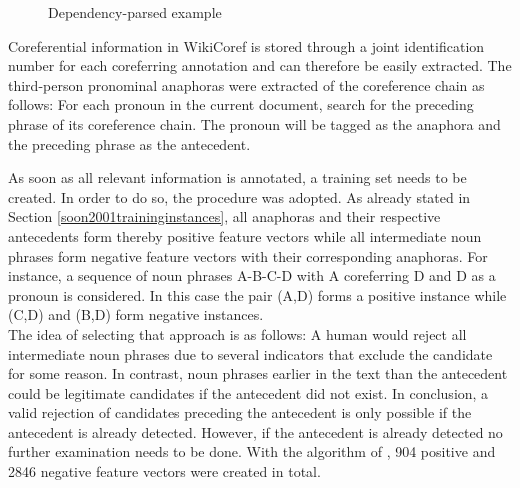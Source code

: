 \begin{figure}[h]
	\centering
	\caption{Dependency-parsed example}
	\label{figure:dependencytree}
\end{figure}


Coreferential information in WikiCoref is stored through a joint identification number for each coreferring annotation and can therefore be easily extracted. The third-person pronominal anaphoras were extracted of the coreference chain as follows: For each pronoun in the current document, search for the preceding phrase of its coreference chain. The pronoun will be tagged as the anaphora and the preceding phrase as the antecedent. 

As soon as all relevant information is annotated, a training set needs to be created. In order to do so, the procedure \cite{soon2001machine} was adopted. As already stated in Section \ref{soon2001traininginstances}, all anaphoras and their respective antecedents form thereby positive feature vectors while all intermediate noun phrases form negative feature vectors with their corresponding anaphoras. For instance, a sequence of noun phrases A-B-C-D with A coreferring D and D as a pronoun is considered. In this case the pair (A,D) forms a positive instance while (C,D) and (B,D) form negative instances.\\
The idea of selecting that approach is as follows: A human would reject all intermediate noun phrases due to several indicators that exclude the candidate for some reason. In contrast, noun phrases earlier in the text than the antecedent could be legitimate candidates if the antecedent did not exist. In conclusion, a valid rejection of candidates preceding the antecedent is only possible if the antecedent is already detected. However, if the antecedent is already detected no further examination needs to be done. With the algorithm of \cite{soon2001machine}, 904 positive and 2846 negative feature vectors were created in total.

